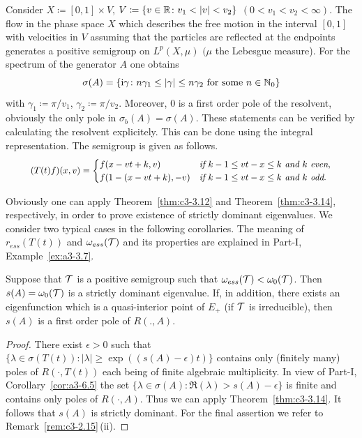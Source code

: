 \begin{example}\label{ex:c3-3.15}
	Consider $X \coloneq  [0,1] \times V$, $V \coloneq  \{v \in \mathbb{R}  \colon v_{1} < |v| < v_{2}\}$ $(0 < v_{1} < v_{2} < \infty)$. 
	The flow in the phase space $X$ which describes the free motion in the interval $[0,1]$ with velocities in $V$ assuming that the particles are reflected at the endpoints generates a positive semigroup on $L^{p}(X,\mu)$ $(\mu$ the Lebesgue measure). 
	For the spectrum of the generator $A$ one obtains 
    \[
    \sigma(A) = \{\im \gamma \colon n\gamma_{1} \leq |\gamma| \leq n\gamma_{2} \text{ for some } n \in \N_{0}\}
    \]
    with $\gamma_{1} \coloneq  \pi/v_{1}$, $\gamma_{2} \coloneq  \pi/v_{2}$. 
	Moreover, $0$ is a first order pole of the resolvent, obviously the only pole in $\sigma_{b}(A) = \sigma(A)$.
	These statements can be verified by calculating the resolvent explicitely. 
	This can be done using the integral representation. 
    The semigroup is given as follows.
\begin{equation}\label{eq:c3-3.20}
	\textit{\small $
	(T(t)f)(x,v) = \begin{cases}
		f(x-vt+k,v) & \text{if } k-1\leq vt-x\leq k \text{ and } k \textit{ even}, \\
		f(1-(x-vt+k),-v) & \text{if } k-1\leq vt-x\leq k \text{ and } k \text{ odd}.
	\end{cases}
$}
\end{equation} 

Obviously one can apply Theorem~\ref{thm:c3-3.12} and Theorem~\ref{thm:c3-3.14}, respectively, in order to prove existence of strictly dominant eigenvalues. 
We consider two typical cases in the following corollaries. 
The meaning of\/ $r_{ess}(T(t))$ and $\omega_{ess}(\mathcal{T})$ and its properties are explained in Part-I, Example~\ref{ex:a3-3.7}.
\end{example}
\begin{corollary}\label{cor:c3-3.16}
	Suppose that $\mathcal{T}$ is a positive semigroup such that $\omega_{ess}(\mathcal{T}) < \omega_0(\mathcal{T})$. 
	Then $s(A) = \omega_0(\mathcal{T})$ is a strictly dominant eigenvalue.
	If, in addition, there exists an eigenfunction which is a quasi-interior point of\/ $E_{+}$ (\eg if\/ $\mathcal{T}$ is irreducible), then $s(A)$ is a first order pole of\/ $R(.,A)$.
\end{corollary}
\begin{proof}
	There exist $\epsilon > 0$ such that 
    $\{\lambda \in \sigma(T(t)) \colon |\lambda| \geq \exp((s(A)-\epsilon)t)\}$ contains only (finitely many) poles of\/ $R(\cdot,T(t))$ each being of finite algebraic multiplicity. 
	In view of Part-I, Corollary~\ref{cor:a3-6.5} the set $\{\lambda \in \sigma(A) \colon \Re(\lambda) > s(A)-\epsilon\}$ is finite and contains only poles of\/ $R(\cdot,A)$. 
	Thus we can apply Theorem~\ref{thm:c3-3.14}. 
	It follows that $s(A)$ is strictly dominant.
	For the final assertion we refer to Remark~\ref{rem:c3-2.15}\,(ii).
\end{proof}
